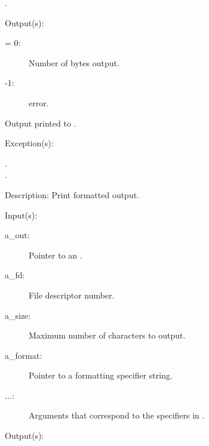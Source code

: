 \begin{capi}
\begin{capilist}
\begin{description}
			.
		\end{description}
	\item[Output(s): ]
		\begin{description}\item[]
		\item[retval: ]
			\begin{description}\item[]
			\item[{\gt}= 0: ]
				Number of bytes output.
			\item[-1: ]
				 error.
			\end{description}
		\item{Output printed to .}
		\end{description}
	\item[Exception(s): ]
		\begin{description}\item[]
		\item[.]
		\item[.]
		\end{description}
	\item[Description: ]
		Print formatted output.
	\end{capilist}
\label{out_put_fn}
\label{_cw_out_put_fn}
	\begin{capilist}
	\item[Input(s): ]
		\begin{description}\item[]
		\item[a\_out: ]
			Pointer to an .
		\item[a\_fd: ]
			File descriptor number.
		\item[a\_size: ]
			Maximum number of characters to output.
		\item[a\_format: ]
			Pointer to a formatting specifier string.
		\item[...: ]
			Arguments that correspond to the specifiers in
			.
		\end{description}
	\item[Output(s): ]

\end{capilist}
\end{capi}
